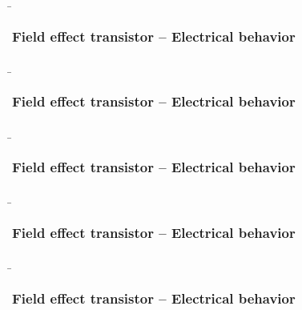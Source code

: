 \begin{frame}
    \b{ \frametitle{Field effect transistor -- Electrical behavior}
        \begin{figure}[H]
            \centering
            
        \end{figure}

    }
\end{frame}

\begin{frame}
    \b{ \frametitle{Field effect transistor -- Electrical behavior}
        \begin{figure}[H]
            \centering
            
        \end{figure}
    }
\end{frame}

\begin{frame}
    \b{ \frametitle{Field effect transistor -- Electrical behavior}
        \begin{figure}[H]
            \centering
            
        \end{figure}
    }
\end{frame}

\begin{frame}
    \b{ \frametitle{Field effect transistor -- Electrical behavior}
        \begin{figure}[H]
            \centering
            
        \end{figure}
    }
\end{frame}

\begin{frame}
    \b{ \frametitle{Field effect transistor -- Electrical behavior}
        \begin{figure}[H]
            \centering
            
        \end{figure}
    }
\end{frame}

